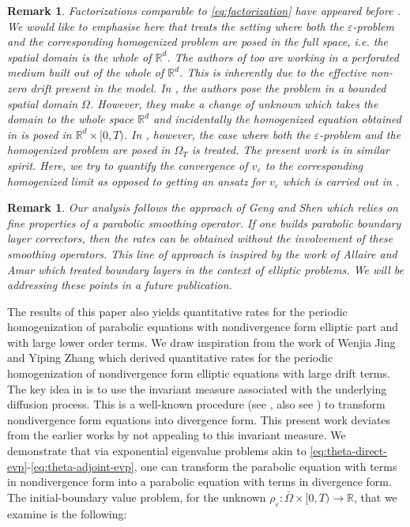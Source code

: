 \documentclass[preprint, 12pt]{amsart}
\numberwithin{equation}{section}
\newtheorem{remark}[theorem]{Remark}        %
\numberwithin{equation}{section}
\newcommand\RR{\mathbb{R}}
\newcommand{\eps}{\varepsilon}
\begin{document}
\begin{remark}
Factorizations comparable to \eqref{eq:factorization} have appeared before \cite{donato2005averaging, allaireraphael2007homogenization, allaire2007homogenization}. We would like to emphasise here that \cite{donato2005averaging} treats the setting where both the $\eps$-problem and the corresponding homogenized problem are posed in the full space, i.e. the spatial domain is the whole of $\RR^d$. The authors of \cite{allaireraphael2007homogenization} too are working in a perforated medium built out of the whole of $\RR^d$. This is inherently due to the effective non-zero drift present in the model. In \cite{allaire2007homogenization}, the authors pose the problem in a bounded spatial domain $\Omega$. However, they make a change of unknown which takes the domain to the whole space $\RR^d$ and incidentally the homogenized equation obtained in \cite[Theorem 3.1]{allaire2007homogenization} is posed in $\RR^d\times[0,T)$. In \cite{allaire2012homogenization}, however, the case where both the $\eps$-problem and the homogenized problem are posed in $\Omega_T$ is treated. The present work is in similar spirit. Here, we try to quantify the convergence of $v_{\eps}$ to the corresponding homogenized limit as opposed to getting an ansatz for $v_{\eps}$ which is carried out in \cite{allaire2012homogenization}.
\end{remark}
\begin{remark}
Our analysis follows the approach of Geng and Shen \cite{geng2017convergence} which relies on fine properties of a parabolic smoothing operator. If one builds parabolic boundary layer correctors, then the rates can be obtained without the involvement of these smoothing operators. This line of approach is inspired by the work of Allaire and Amar \cite{allaire1999boundary} which treated boundary layers in the context of elliptic problems. We will be addressing these points in a future publication.
\end{remark}
The results of this paper also yields quantitative rates for the periodic homogenization of parabolic equations with nondivergence form elliptic part and with large lower order terms. We draw inspiration from the work of Wenjia Jing and Yiping Zhang \cite{jing2023periodic} which derived quantitative rates for the periodic homogenization of nondivergence form elliptic equations with large drift terms. The key idea in \cite{jing2023periodic} is to use the invariant measure associated with the underlying diffusion process. This is a well-known procedure (see \cite{avellaneda1989compactness, bensoussan2011asymptotic}, also see \cite[section 2.2]{capdeboscq2020finite}) to transform nondivergence form equations into divergence form. This present work deviates from the earlier works by not appealing to this invariant measure. We demonstrate that via exponential eigenvalue problems akin to \eqref{eq:theta-direct-evp}-\eqref{eq:theta-adjoint-evp}, one can transform the parabolic equation with terms in nondivergence form into a parabolic equation with terms in divergence form.   The initial-boundary value problem, for the unknown $\rho_\eps:\overline{\Omega}\times[0,T)\to\RR$, that we examine is the following:
\end{document}

